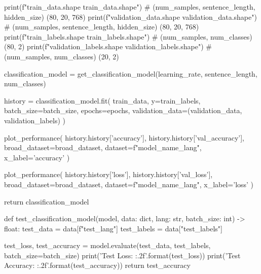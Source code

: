 \begin{python}
    print(f"train_data.shape {train_data.shape}")  # (num_samples, sentence_length, hidden_size) (80, 20, 768)
    print(f"validation_data.shape {validation_data.shape}")  # (num_samples, sentence_length, hidden_size) (80, 20, 768)
    print(f"train_labels.shape {train_labels.shape}")  # (num_samples, num_classes) (80, 2)
    print(f"validation_labels.shape {validation_labels.shape}")  # (num_samples, num_classes) (20, 2)

    classification_model = get_classification_model(learning_rate, sentence_length, num_classes)

    history = classification_model.fit(
        train_data,
        y=train_labels,
        batch_size=batch_size,
        epochs=epochs,
        validation_data=(validation_data, validation_labels)
    )

    plot_performance(
        history.history['accuracy'],
        history.history['val_accuracy'],
        broad_dataset=broad_dataset,
        dataset=f"{model_name}_{lang}",
        x_label='accuracy'
    )

    plot_performance(
        history.history['loss'],
        history.history['val_loss'],
        broad_dataset=broad_dataset,
        dataset=f"{model_name}_{lang}",
        x_label='loss'
    )

    return classification_model


def test_classification_model(model, data: dict, lang: str, batch_size: int) -> float:
    test_data = data[f"test_{lang}"]
    test_labels = data["test_labels"]

    test_loss, test_accuracy = model.evaluate(test_data, test_labels, batch_size=batch_size)
    print('Test Loss: {:.2f}'.format(test_loss))
    print('Test Accuracy: {:.2f}'.format(test_accuracy))
    return test_accuracy
\end{python}
